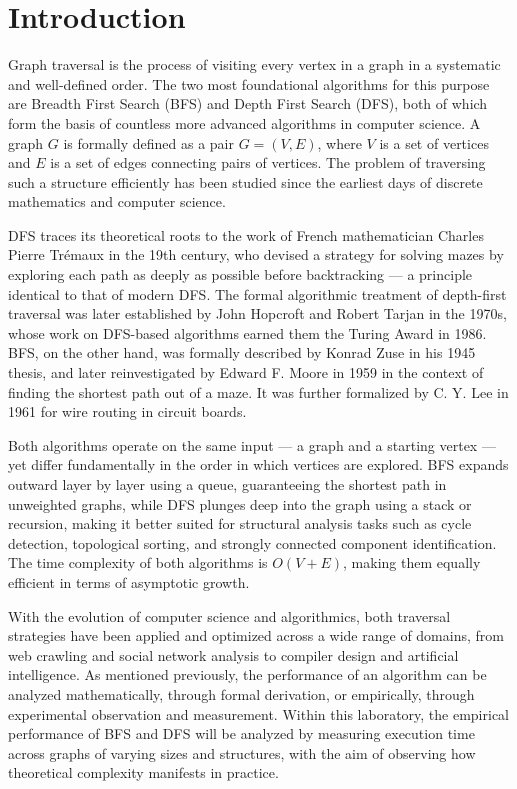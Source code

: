 \documentclass[12pt, a4paper]{report}
\begin{document}
\section{Introduction}

Graph traversal is the process of visiting every vertex in a graph in a
systematic and well-defined order. The two most foundational algorithms
for this purpose are Breadth First Search (BFS) and Depth First Search
(DFS), both of which form the basis of countless more advanced algorithms
in computer science. A graph $G$ is formally defined as a pair $G = (V, E)$,
where $V$ is a set of vertices and $E$ is a set of edges connecting pairs
of vertices. The problem of traversing such a structure efficiently has
been studied since the earliest days of discrete mathematics and computer
science.

DFS traces its theoretical roots to the work of French mathematician
Charles Pierre Trémaux in the 19th century, who devised a strategy for
solving mazes by exploring each path as deeply as possible before
backtracking — a principle identical to that of modern DFS. The formal
algorithmic treatment of depth-first traversal was later established by
John Hopcroft and Robert Tarjan in the 1970s, whose work on DFS-based
algorithms earned them the Turing Award in 1986. BFS, on the other hand,
was formally described by Konrad Zuse in his 1945 thesis, and later
reinvestigated by Edward F. Moore in 1959 in the context of finding the
shortest path out of a maze. It was further formalized by C. Y. Lee in
1961 for wire routing in circuit boards.

Both algorithms operate on the same input — a graph and a starting vertex
— yet differ fundamentally in the order in which vertices are explored.
BFS expands outward layer by layer using a queue, guaranteeing the
shortest path in unweighted graphs, while DFS plunges deep into the
graph using a stack or recursion, making it better suited for structural
analysis tasks such as cycle detection, topological sorting, and strongly
connected component identification. The time complexity of both algorithms
is $O(V + E)$, making them equally efficient in terms of asymptotic growth.

With the evolution of computer science and algorithmics, both traversal
strategies have been applied and optimized across a wide range of domains,
from web crawling and social network analysis to compiler design and
artificial intelligence. As mentioned previously, the performance of an
algorithm can be analyzed mathematically, through formal derivation, or
empirically, through experimental observation and measurement. Within
this laboratory, the empirical performance of BFS and DFS will be
analyzed by measuring execution time across graphs of varying sizes and
structures, with the aim of observing how theoretical complexity
manifests in practice.
\end{document}
